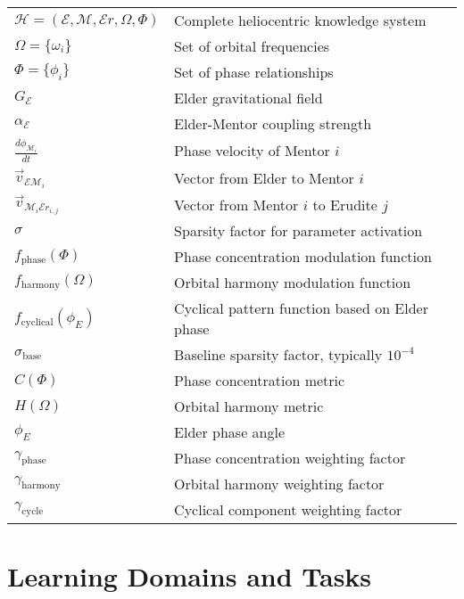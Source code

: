 \begin{tabular}{p{3cm} p{12cm}}
$\mathcal{H} = (\mathcal{E}, \mathcal{M}, \mathcal{E}r, \Omega, \Phi)$ & Complete heliocentric knowledge system \\
$\Omega = \{\omega_i\}$ & Set of orbital frequencies \\
$\Phi = \{\phi_i\}$ & Set of phase relationships \\
$G_{\mathcal{E}}$ & Elder gravitational field \\
$\alpha_{\mathcal{E}}$ & Elder-Mentor coupling strength \\
$\frac{d\phi_{\mathcal{M}_i}}{dt}$ & Phase velocity of Mentor $i$ \\
$\vec{v}_{\mathcal{E}\mathcal{M}_i}$ & Vector from Elder to Mentor $i$ \\
$\vec{v}_{\mathcal{M}_i\mathcal{E}r_{i,j}}$ & Vector from Mentor $i$ to Erudite $j$ \\
$\sigma$ & Sparsity factor for parameter activation \\
$f_{\text{phase}}(\Phi)$ & Phase concentration modulation function \\
$f_{\text{harmony}}(\Omega)$ & Orbital harmony modulation function \\
$f_{\text{cyclical}}(\phi_E)$ & Cyclical pattern function based on Elder phase \\
$\sigma_{\text{base}}$ & Baseline sparsity factor, typically $10^{-4}$ \\
$C(\Phi)$ & Phase concentration metric \\
$H(\Omega)$ & Orbital harmony metric \\
$\phi_E$ & Elder phase angle \\
$\gamma_{\text{phase}}$ & Phase concentration weighting factor \\
$\gamma_{\text{harmony}}$ & Orbital harmony weighting factor \\
$\gamma_{\text{cycle}}$ & Cyclical component weighting factor \\
\end{tabular}

\section*{Learning Domains and Tasks}

